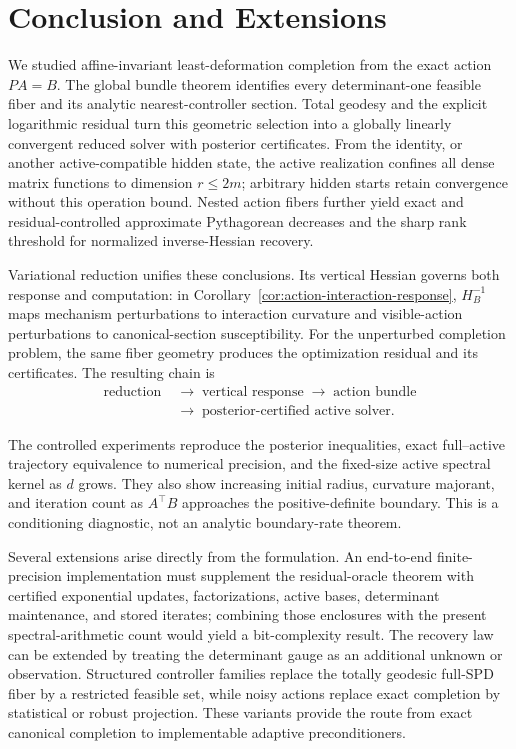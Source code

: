 \section{Conclusion and Extensions}
\label{sec:discussion}

We studied affine-invariant least-deformation completion from the exact action
\(PA=B\).  The global bundle theorem identifies every determinant-one feasible
fiber and its analytic nearest-controller section.  Total geodesy and the
explicit logarithmic residual turn this geometric selection into a globally
linearly convergent reduced solver with posterior certificates.  From the
identity, or another active-compatible hidden state, the active realization
confines all dense matrix functions to dimension \(r\le2m\); arbitrary hidden
starts retain convergence without this operation bound.  Nested action fibers
further yield exact and residual-controlled approximate Pythagorean decreases
and the sharp rank threshold for normalized inverse-Hessian recovery.

Variational reduction unifies these conclusions.  Its vertical Hessian governs
both response and computation: in Corollary~\ref{cor:action-interaction-response},
\(H_B^{-1}\) maps mechanism
perturbations to interaction curvature and visible-action perturbations to
canonical-section susceptibility.  For the unperturbed completion problem,
the same fiber geometry produces the optimization residual and its
certificates.  The resulting chain is
\[
  \begin{aligned}
    \text{reduction}
    &\;\longrightarrow\;\text{vertical response}
      \;\longrightarrow\;\text{action bundle}\\
    &\;\longrightarrow\;\text{posterior-certified active solver}.
  \end{aligned}
\]

The controlled experiments reproduce the posterior inequalities, exact
full--active trajectory equivalence to numerical precision, and the fixed-size
active spectral kernel as \(d\) grows.  They also show increasing initial
radius, curvature majorant, and iteration count as \(A^\top B\) approaches the
positive-definite boundary.  This is a conditioning diagnostic, not an
analytic boundary-rate theorem.

Several extensions arise directly from the formulation.  An end-to-end
finite-precision implementation must supplement the residual-oracle theorem
with certified exponential updates, factorizations, active bases, determinant
maintenance, and stored iterates; combining those enclosures with the present
spectral-arithmetic count would yield a bit-complexity result.  The recovery
law can be extended by treating the determinant gauge as an additional unknown
or observation.  Structured controller families replace the totally geodesic
full-SPD fiber by a restricted feasible set, while noisy actions replace exact
completion by statistical or robust projection.  These variants provide the
route from exact canonical completion to implementable adaptive
preconditioners.
